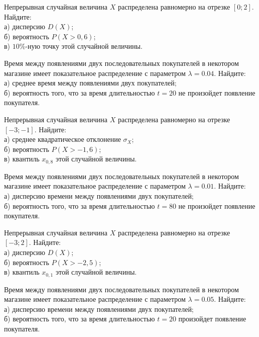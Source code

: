 \vfill

\newpage\setcounter{zad}{0}

\z Непрерывная случайная величина $X$ распределена равномерно на отрезке $[0; 2]$. Найдите: \\ \quad а) дисперсию $D(X)$; \\ \quad б) вероятность $P(X>0{,}6)$; \\ \quad в) $10\%$-ную точку этой случайной величины.


\vfill

\z Время между появлениями двух последовательных покупателей в некотором магазине имеет показательное распределение с параметром $\lambda = 0.04$. Найдите: \\ \quad а) среднее время между появлениями двух покупателей; \\ \quad б) вероятность того, что за время длительностью $t = 20$ не произойдет появление покупателя.
 

\vfill

\newpage\setcounter{zad}{0}

\z Непрерывная случайная величина $X$ распределена равномерно на отрезке $[-3; -1]$. Найдите: \\ \quad а) среднее квадратическое отклонение $\sigma_X$; \\ \quad б) вероятность $P(X>-1{,}6)$; \\ \quad в) квантиль $x_{0{,}8}$ этой случайной величины.


\vfill

\z Время между появлениями двух последовательных покупателей в некотором магазине имеет показательное распределение с параметром $\lambda = 0.01$. Найдите: \\ \quad а) дисперсию времени между появлениями двух покупателей; \\ \quad б) вероятность того, что за время длительностью $t = 80$ не произойдет появление покупателя.
 

\vfill

\newpage\setcounter{zad}{0}

\z Непрерывная случайная величина $X$ распределена равномерно на отрезке $[-3; 2]$. Найдите: \\ \quad а) дисперсию $D(X)$; \\ \quad б) вероятность $P(X>-2{,}5)$; \\ \quad в) квантиль $x_{0{,}1}$ этой случайной величины.


\vfill

\z Время между появлениями двух последовательных покупателей в некотором магазине имеет показательное распределение с параметром $\lambda = 0.05$. Найдите: \\ \quad а) дисперсию времени между появлениями двух покупателей; \\ \quad б) вероятность того, что за время длительностью $t = 20$  произойдет появление покупателя.
 


